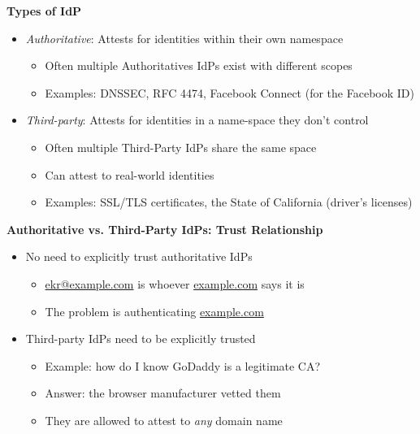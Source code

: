 \documentclass[helvetica]{seminar}
\newcommand{\heading}[1]{%
  \begin{center} 
    \large\bf 
    #1 
  \end{center} 
  \vspace{.4 in}}
\begin{document}
\begin{slide}
\heading{Types of IdP}

\begin{itemize}
\item[] \emph{Authoritative}: Attests for identities within their own namespace
  \begin{itemize}
  \item Often multiple Authoritatives IdPs exist with different scopes
  \item Examples: DNSSEC, RFC 4474, Facebook Connect (for the Facebook ID)
  \end{itemize}

\item[] \emph{Third-party}: Attests for identities in a name-space they don't control
  \begin{itemize}
  \item Often multiple Third-Party IdPs share the same space
  \item Can attest to real-world identities
  \item Examples: SSL/TLS certificates, the State of California (driver's licenses)
  \end{itemize}
\end{itemize}
\end{slide}


\begin{slide}
\heading{Authoritative vs. Third-Party IdPs: Trust Relationship}

\begin{itemize}
\item No need to explicitly trust authoritative IdPs
  \begin{itemize}
  \item \url{ekr@example.com} is whoever \url{example.com} says it is
  \item The problem is authenticating \url{example.com}
  \end{itemize}

\item Third-party IdPs need to be explicitly trusted
  \begin{itemize}
  \item Example: how do I know GoDaddy is a legitimate CA?
  \item Answer: the browser manufacturer vetted them
  \item They are allowed to attest to \emph{any} domain name
  \end{itemize}
\end{itemize}
\end{slide}
\end{document}
